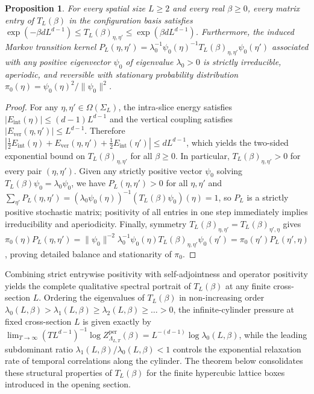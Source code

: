\documentclass[11pt]{article}
\newtheorem{proposition}[theorem]{Proposition}
\theoremstyle{definition}
\begin{document}
\begin{proposition}
\label{prop:s05-entrywise-pos}
For every spatial size $L \ge 2$ and every real $\beta \ge 0$, every matrix entry of
$T_L(\beta)$ in the configuration basis satisfies $\exp(-\beta d L^{d-1}) \le
T_L(\beta)_{\eta, \eta'} \le \exp(\beta d L^{d-1})$. Furthermore, the induced Markov
transition kernel $P_L(\eta, \eta') = \lambda_0^{-1} \psi_0(\eta)^{-1}
T_L(\beta)_{\eta, \eta'} \psi_0(\eta')$ associated with any positive eigenvector
$\psi_0$ of eigenvalue $\lambda_0 > 0$ is strictly irreducible, aperiodic, and
reversible with stationary probability distribution $\pi_0(\eta) = \psi_0(\eta)^2 /
\|\psi_0\|^2$.
\end{proposition}
\begin{proof}
For any $\eta, \eta' \in \Omega(\Sigma_L)$, the intra-slice energy satisfies
$|E_{\mathrm{int}}(\eta)| \le (d-1) L^{d-1}$ and the vertical coupling satisfies
$|E_{\mathrm{ver}}(\eta, \eta')| \le L^{d-1}$. Therefore $|\frac{1}{2}
E_{\mathrm{int}}(\eta) + E_{\mathrm{ver}}(\eta, \eta') + \frac{1}{2}
E_{\mathrm{int}}(\eta')| \le d L^{d-1}$, which yields the two-sided exponential
bound on $T_L(\beta)_{\eta, \eta'}$ for all $\beta \ge 0$. In particular,
$T_L(\beta)_{\eta, \eta'} > 0$ for every pair $(\eta, \eta')$. Given any strictly
positive vector $\psi_0$ solving $T_L(\beta) \psi_0 = \lambda_0 \psi_0$, we have
$P_L(\eta, \eta') > 0$ for all $\eta, \eta'$ and $\sum_{\eta'} P_L(\eta, \eta') =
(\lambda_0 \psi_0(\eta))^{-1} (T_L(\beta) \psi_0)(\eta) = 1$, so $P_L$ is a strictly
positive stochastic matrix; positivity of all entries in one step immediately
implies irreducibility and aperiodicity. Finally, symmetry $T_L(\beta)_{\eta, \eta'}
= T_L(\beta)_{\eta', \eta}$ gives $\pi_0(\eta) P_L(\eta, \eta') = \|\psi_0\|^{-2}
\lambda_0^{-1} \psi_0(\eta) T_L(\beta)_{\eta, \eta'} \psi_0(\eta') = \pi_0(\eta')
P_L(\eta', \eta)$, proving detailed balance and stationarity of $\pi_0$.
\end{proof}

Combining strict entrywise positivity with self-adjointness and operator positivity
yields the complete qualitative spectral portrait of $T_L(\beta)$ at any finite
cross-section $L$. Ordering the eigenvalues of $T_L(\beta)$ in non-increasing order
$\lambda_0(L, \beta) > \lambda_1(L, \beta) \ge \lambda_2(L, \beta) \ge \dots > 0$,
the infinite-cylinder pressure at fixed cross-section $L$ is given exactly by
$\lim_{T \to \infty} (T L^{d-1})^{-1} \log Z_{\Lambda_{L,T}}^{\mathrm{per}}(\beta) =
L^{-(d-1)} \log \lambda_0(L, \beta)$, while the leading subdominant ratio
$\lambda_1(L, \beta) / \lambda_0(L, \beta) < 1$ controls the exponential relaxation
rate of temporal correlations along the cylinder. The theorem below consolidates
these structural properties of $T_L(\beta)$ for the finite hypercubic lattice boxes
introduced in the opening section.
\end{document}
